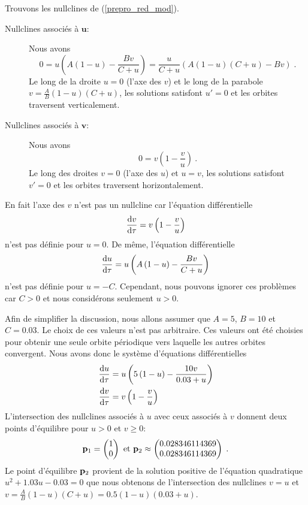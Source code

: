{Trouvons les nullclines de (\ref{prepro_red_mod}).
\begin{description}
\item[Nullclines associés à $\mathbf u$:] Nous avons
\[
0 = u \left( A\left( 1 - u\right) - \frac{B v}{C + u} \right)
= \frac{u}{C+u} \left( A(1-u)(C+u) - Bv \right) \; .
\]
Le long de la droite $u=0$ (l'axe des $v$) et le long de la parabole
$\displaystyle v = \frac{A}{B}(1-u)(C+u)$, les solutions satisfont
$u' = 0$ et les orbites traversent verticalement.
\item[Nullclines associés à $\mathbf v$:] Nous avons
\[
0 = v \left(1 - \frac{v}{u}\right) \ .
\]
Le long des droites $v=0$ (l'axe des $u$) et $u=v$, les solutions
satisfont $v' =0$ et les orbites traversent horizontalement.
\end{description}
En fait l'axe des $v$ n'est pas un nullcline car l'équation
différentielle
\[
\frac{\mathrm{d}v}{\mathrm{d}\tau} = v \left(1 - \frac{v}{u}\right)
\]
n'est pas définie pour $u=0$.  De même, l'équation différentielle
\[
\frac{\mathrm{d}u}{\mathrm{d}\tau} = u \left( A\left( 1 - u\right) - \frac{B v}{C + u} \right)
\]
n'est pas définie pour $u=-C$.  Cependant, nous pouvons ignorer ces
problèmes car $C>0$ et nous considérons seulement $u>0$.

Afin de simplifier la discussion, nous allons assumer que $A=5$,
$B=10$ et $C=0.03$.  Le choix de ces valeurs n'est pas arbitraire.
Ces valeurs ont été choisies pour obtenir une seule orbite
périodique vers laquelle les autres orbites
\flqq convergent\frqq.  Nous avons donc le système d'équations
différentielles
\begin{equation} \label{prepro_red_modABC}
\begin{split}
\frac{\mathrm{d}u}{\mathrm{d}\tau} &= u \left( 5\left( 1 - u\right) - \frac{10 v}{0.03 +
    u} \right) \\
\frac{\mathrm{d}v}{\mathrm{d}\tau} &= v \left(1 - \frac{v}{u}\right)
\end{split}
\end{equation}
L'intersection des nullclines associés à $u$ avec ceux associés à $v$
donnent deux points d'équilibre pour $u>0$ et $v\geq 0$:
\[
\VEC{p}_1 = \begin{pmatrix} 1 \\ 0 \end{pmatrix} \ \text{et} \ 
\VEC{p}_2 \approx \begin{pmatrix} 0.028346114369 \\ 0.028346114369
\end{pmatrix} \; .
\]
Le point d'équilibre $\mathbf{p}_2$ provient de la solution positive de
l'équation quadratique $u^2 + 1.03u -0.03 =0$ que nous obtenons de
l'intersection des nullclines $v=u$ et
$v = \frac{A}{B}(1-u)(C+u) = 0.5(1-u)(0.03+u)$.

}
